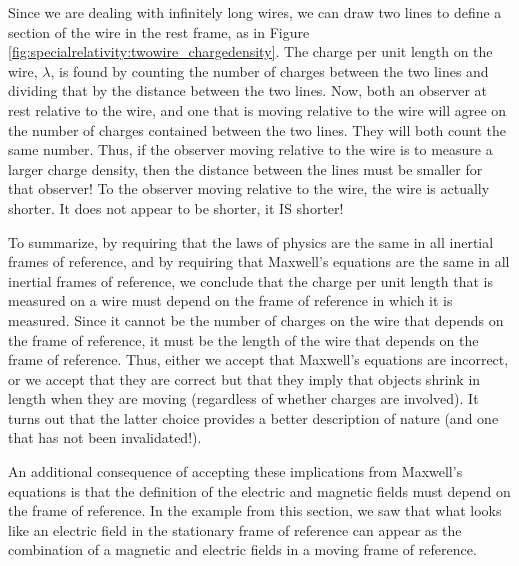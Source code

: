 Since we are dealing with infinitely long wires, we can draw two lines to define a section of the wire in the rest frame, as in Figure \ref{fig:specialrelativity:twowire_chargedensity}. The charge per unit length on the wire, $\lambda$, is found by counting the number of charges between the two lines and dividing that by the distance between the two lines. Now, both an observer at rest relative to the wire, and one that is moving relative to the wire will agree on the number of charges contained between the two lines. They will both count the same number. Thus, if the observer moving relative to the wire is to measure a larger charge density, then the distance between the lines must be smaller for that observer! To the observer moving relative to the wire, the wire is actually shorter. It does not appear to be shorter, it IS shorter!

To summarize, by requiring that the laws of physics are the same in all inertial frames of reference, and by requiring that Maxwell's equations are the same in all inertial frames of reference, we conclude that the charge per unit length that is measured on a wire must depend on the frame of reference in which it is measured. Since it cannot be the number of charges on the wire that depends on the frame of reference, it must be the length of the wire that depends on the frame of reference. Thus, either we accept that Maxwell's equations are incorrect, or we accept that they are correct but that they imply that objects shrink in length when they are moving (regardless of whether charges are involved). It turns out that the latter choice provides a better description of nature (and one that has not been invalidated!). 

An additional consequence of accepting these implications from Maxwell's equations is that the definition of the electric and magnetic fields must depend on the frame of reference. In the example from this section, we saw that what looks like an electric field in the stationary frame of reference can appear as the combination of a magnetic and electric fields in a moving frame of reference.

